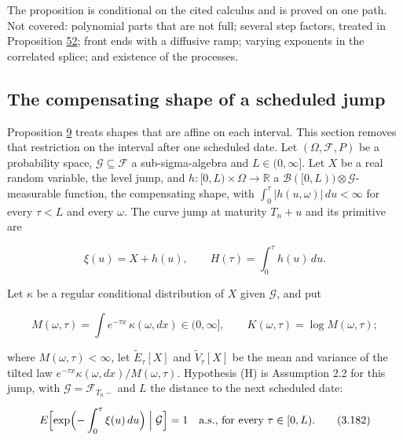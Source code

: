 \documentclass[11pt]{article}
\begin{document}
The proposition is conditional on the cited calculus and is proved on one path. Not covered: polynomial parts that are not full; several step factors, treated in Proposition \hyperref[res:Proposition-52]{52}; front ends with a diffusive ramp; varying exponents in the correlated splice; and existence of the processes.

\subsection{The compensating shape of a scheduled jump}\label{sec:3.42}

Proposition \hyperref[res:Proposition-9]{9} treats shapes that are affine on each interval. This section removes that restriction on the interval after one scheduled date. Let \((\Omega,\mathcal F,P)\) be a probability space, \(\mathcal G\subseteq\mathcal F\) a sub-sigma-algebra and \(L\in(0,\infty]\). Let \(X\) be a real random variable, the level jump, and \(h:[0,L)\times\Omega\to\mathbb R\) a \(\mathcal B([0,L))\otimes\mathcal G\)-measurable function, the compensating shape, with \(\int_0^\tau|h(u,\omega)|\,du<\infty\) for every \(\tau<L\) and every \(\omega\). The curve jump at maturity \(T_n+u\) and its primitive are

\begin{equation*}
\xi(u)=X+h(u),\qquad H(\tau)=\int_0^\tau h(u)\,du. \tag{3.180}\label{eq:3.180}
\end{equation*}

Let \(\kappa\) be a regular conditional distribution of \(X\) given \(\mathcal G\), and put

\begin{equation*}
M(\omega,\tau)=\int e^{-\tau x}\,\kappa(\omega,dx)\in(0,\infty],\qquad K(\omega,\tau)=\log M(\omega,\tau); \tag{3.181}\label{eq:3.181}
\end{equation*}

where \(M(\omega,\tau)<\infty\), let \(\tilde E_\tau[X]\) and \(\tilde V_\tau[X]\) be the mean and variance of the tilted law \(e^{-\tau x}\kappa(\omega,dx)/M(\omega,\tau)\). Hypothesis (H) is Assumption 2.2 for this jump, with \(\mathcal G=\mathcal F_{T_n-}\) and \(L\) the distance to the next scheduled date:

\begin{equation*}
E\Bigl[\exp\Bigl(-\int_0^\tau\xi(u)\,du\Bigr)\Bigm|\mathcal G\Bigr]=1\quad\text{a.s., for every }\tau\in[0,L). \tag{3.182}\label{eq:3.182}
\end{equation*}
\end{document}
